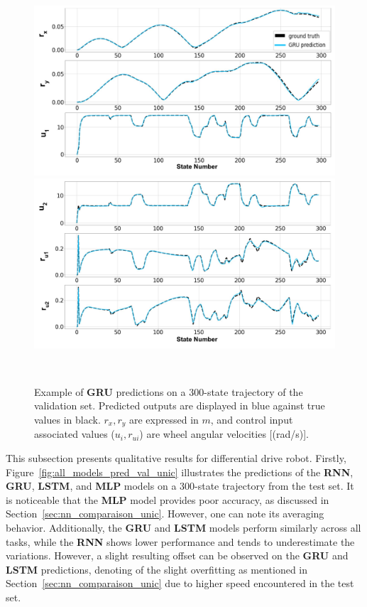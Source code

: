 \begin{figure}[htp]
    \centering
    \begin{minipage}{0.49\linewidth}
        \centering
        \includegraphics[width=\linewidth]{figures/learning_unic/pred_val_1_labeled.jpg}
    \end{minipage}
    \begin{minipage}{0.49\linewidth}
        \centering
        \includegraphics[width=\linewidth]{figures/learning_unic/pred_val_2_labeled.jpg}
    \end{minipage}\\
    \caption{Example of \textbf{GRU} predictions on a 300-state trajectory of the validation set. 
    Predicted outputs are displayed in blue against true values in black. $r_{x}, r_{y}$ are expressed in $m$, and control input associated values ($u_{i},r_{ui}$) are wheel angular velocities [(rad/s)].}
    \label{fig:pred_val_unic}
\end{figure}

This subsection presents qualitative results for differential drive robot.
Firstly, Figure~\ref{fig:all_models_pred_val_unic} illustrates the predictions of the \textbf{RNN}, \textbf{GRU}, \textbf{LSTM}, and \textbf{MLP} models on a 300-state trajectory from the test set.
It is noticeable that the \textbf{MLP} model provides poor accuracy, as discussed in Section~\ref{sec:nn_comparaison_unic}.
However, one can note its averaging behavior.
Additionally, the \textbf{GRU} and \textbf{LSTM} models perform similarly across all tasks, while the \textbf{RNN} shows lower performance and tends to underestimate the variations.
However, a slight resulting offset can be observed on the \textbf{GRU} and \textbf{LSTM} predictions, denoting of the slight overfitting as mentioned in Section~\ref{sec:nn_comparaison_unic} due to higher speed encountered in the test set.

